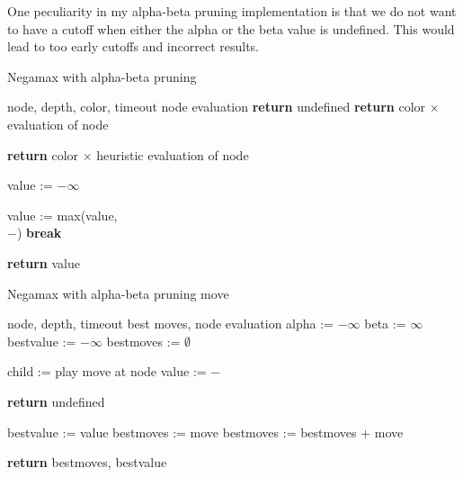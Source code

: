 \documentclass[a4paper]{article}
\begin{document}
One peculiarity in my alpha-beta pruning implementation is that we do not want
to have a cutoff when either the alpha or the beta value is undefined. This
would lead to too early cutoffs and incorrect results.

\begin{algorithm}
	\caption{Negamax with alpha-beta pruning}
	\label{alg: alpha beta}
	\begin{algorithmic}[1]
		\Require node, depth, color, timeout
		\Ensure node evaluation
				\State \textbf{return} undefined
			\EndIf
				\State \textbf{return} color $\times$ evaluation of node
			\EndIf

				\State \textbf{return} color $\times$ heuristic evaluation of node
			\EndIf

			\State value := $-\infty$

				\State value := max(value, \\\hspace{2cm}$-$)
					\State \textbf{break}
				\EndIf
			\EndFor

			\State \textbf{return} value
		\EndFunction
	\end{algorithmic}
\end{algorithm}

\begin{algorithm}
	\caption{Negamax with alpha-beta pruning move}
	\label{alg: alpha beta move}
	\begin{algorithmic}[1]
		\Require node, depth, timeout
		\Ensure best moves, node evaluation
			\State alpha := $-\infty$
			\State beta := $\infty$
			\State bestvalue := $-\infty$
			\State bestmoves := $\emptyset$

				\State child := play move at node
				\State value := $-$

					\State \textbf{return} undefined
				\EndIf

					\State bestvalue := value
					\State bestmoves := move
					\State bestmoves := bestmoves + move
				\EndIf
			\EndFor

			\State \textbf{return} bestmoves, bestvalue
		\EndFunction
	\end{algorithmic}
\end{algorithm}
\end{document}
